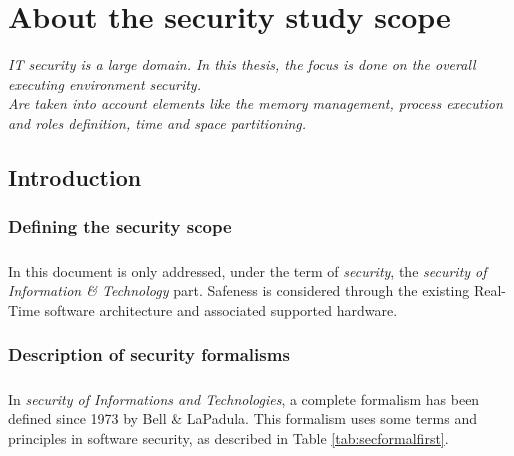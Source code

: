 
\chapter{About the security study scope}

{\it
IT security is a large domain. In this thesis, the focus is done on the overall executing
environment security.\\
Are taken into account elements like the memory management, process execution and roles definition,
time and space partitioning.
}

\doMinitoc

\section{Introduction}

\subsection{Defining the security scope}

\paragraph{}
In this document is only addressed, under the term of {\it security}, the {\it security of
Information \& Technology} part. Safeness is considered through the existing Real-Time software
architecture and associated supported hardware.

\subsection{Description of security formalisms}

\paragraph{}
In {\it security of Informations and Technologies}, a complete formalism has been defined since
1973 by Bell \& LaPadula. This formalism uses some terms and principles in software security, as
described in Table \ref{tab:secformalfirst}.

